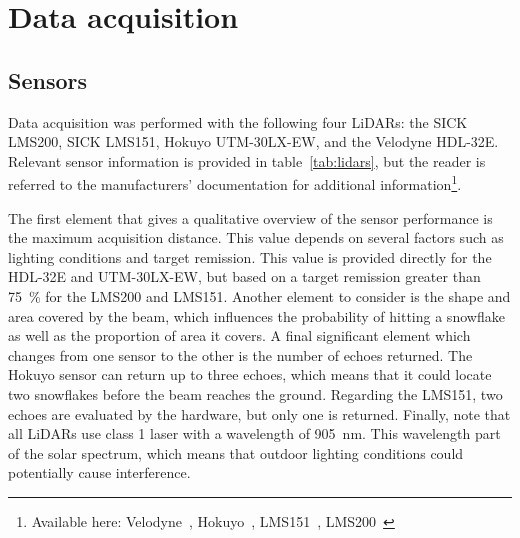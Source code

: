 \section{Data acquisition}

\subsection{Sensors}

Data acquisition was performed with the following four LiDARs: the SICK LMS200, SICK LMS151, Hokuyo UTM-30LX-EW, and the Velodyne HDL-32E. Relevant sensor information is provided in table~\ref{tab:lidars}, but the reader is referred to the manufacturers' documentation for additional information\footnote{Available here: Velodyne~\cite{VelodyneManual}, Hokuyo~\cite{UTMDatasheet}, LMS151~\cite{LMS151Datasheet}, LMS200~\cite{LMS200Manual}}.

The first element that gives a qualitative overview of the sensor performance is the maximum acquisition distance. This value depends on several factors such as lighting conditions and target remission. This value is provided directly for the HDL-32E and UTM-30LX-EW, but based on a target remission greater than \SI{75}{\percent} for the LMS200 and LMS151. Another element to consider is the shape and area covered by the beam, which influences the probability of hitting a snowflake as well as the proportion of area it covers. A final significant element which changes from one sensor to the other is the number of echoes returned. The Hokuyo sensor can return up to three echoes, which means that it could locate two snowflakes before the beam reaches the ground. Regarding the LMS151, two echoes are evaluated by the hardware, but only one is returned. Finally, note that all LiDARs use class 1 laser with a wavelength of \SI{905}{\nano\meter}. This wavelength part of the solar spectrum, which means that outdoor lighting conditions could potentially cause interference.


